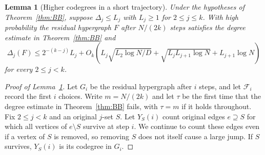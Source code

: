 \documentclass[11pt,reqno]{amsart}
\numberwithin{equation}{section}
\theoremstyle{plain}
\newtheorem{lemma}[theorem]{Lemma}
\theoremstyle{definition}
\begin{document}
\begin{lemma}[Higher codegrees in a short trajectory]\label{lem:short}
    Under the hypotheses of Theorem~\ref{thm:BB}, suppose $\Delta_j\le L_j$ with $L_j\ge1$ for $2\le j\le k$.
    With high probability the residual hypergraph $F$ after $N/(2k)$ steps satisfies the degree estimate in Theorem~\ref{thm:BB} and
    \begin{equation*}
        \Delta_j(F)\le2^{-(k-j)}L_j+ O_k\left(L_j\sqrt{L_2\log N/D}+\sqrt{L_jL_{j+1}\log N}+L_{j+1}\log N\right)
    \end{equation*}
    for every $2\le j<k$.
\end{lemma}
\begin{proof}[Proof of Lemma~\ref{lem:short}]
    Let $G_i$ be the residual hypergraph after $i$ steps, and let $\mathcal F_i$ record the first $i$ choices.
    Write $m=N/(2k)$ and let $\tau$ be the first time that the degree estimate in Theorem~\ref{thm:BB} fails, with $\tau=m$ if it holds throughout.
    Fix $2\le j<k$ and an original $j$-set $S$.
    Let $Y_S(i)$ count original edges $e\supseteq S$ for which all vertices of $e\setminus S$ survive at step $i$.
    We continue to count these edges even if a vertex of $S$ is removed, so removing $S$ does not itself cause a large jump.
    If $S$ survives, $Y_S(i)$ is its codegree in $G_i$.


\end{proof}
\end{document}

